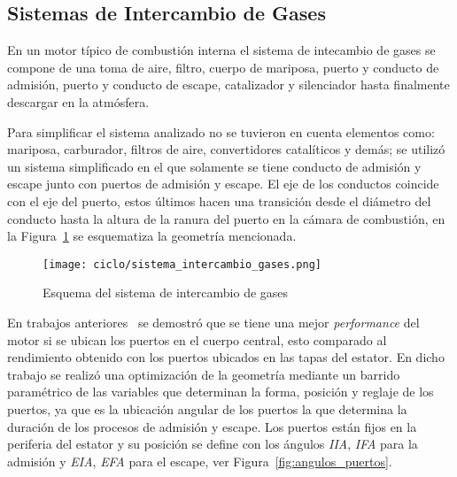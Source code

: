 

\subsection{Sistemas de Intercambio de Gases}
%
En un motor típico de combustión interna el sistema de intecambio de gases se
compone de una toma de aire, filtro, cuerpo de mariposa, puerto y conducto de
admisión, puerto y conducto de escape, catalizador y silenciador hasta
finalmente descargar en la atmósfera.

Para simplificar el sistema analizado no se tuvieron en cuenta elementos como:
mariposa, carburador, filtros de aire, convertidores catalíticos y demás; se
utilizó un sistema simplificado en el que solamente se tiene conducto de
admisión y escape junto con puertos de admisión y escape.
%
El eje de los conductos coincide con el eje del puerto, estos últimos hacen una
transición desde el diámetro del conducto hasta la altura de la ranura del
puerto en la cámara de combustión, en la
Figura~\ref{fig:sistema_intercambio_gases} se esquematiza la geometría
mencionada.

\begin{figure}
    \centering
    \texttt{[image: ciclo/sistema\_intercambio\_gases.png]}
    \caption{Esquema del sistema de intercambio de gases}\label{fig:sistema_intercambio_gases}
\end{figure}


En trabajos anteriores~\parencite{lopez13} se demostró que se tiene una mejor
\emph{performance} del motor si se ubican los puertos en el cuerpo central, esto
comparado al rendimiento obtenido con los puertos ubicados en las tapas del
estator.
%
En dicho trabajo se realizó una optimización de la geometría mediante un barrido
paramétrico de las variables que determinan la forma, posición y reglaje de los
puertos, ya que es la ubicación angular de los puertos la que determina la
duración de los procesos de admisión y escape.
%
Los puertos están fijos en la periferia del estator y su posición se define con
los ángulos \emph{IIA}, \emph{IFA} para la admisión y \emph{EIA}, \emph{EFA}
para el escape, ver Figura~\ref{fig:angulos_puertos}.

